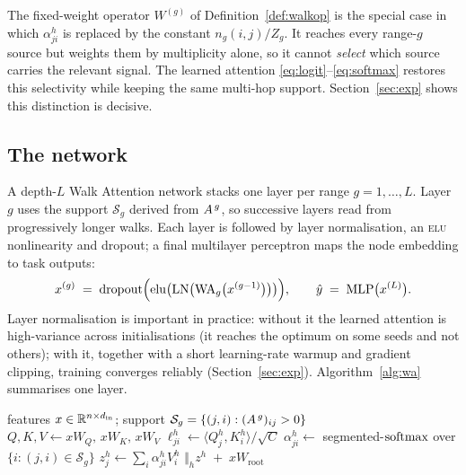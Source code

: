 \begin{remark}
The fixed-weight operator $W^{(g)}$ of Definition~\ref{def:walkop} is the special
case in which $\alpha^h_{ji}$ is replaced by the constant $n_g(i,j)/Z_g$.
It reaches every range-$g$ source but weights them by multiplicity alone, so it
cannot \emph{select} which source carries the relevant signal. The learned
attention \eqref{eq:logit}--\eqref{eq:softmax} restores this selectivity while
keeping the same multi-hop support. Section~\ref{sec:exp} shows this distinction
is decisive.
\end{remark}

\subsection{The network}

A depth-$L$ Walk Attention network stacks one layer per range
$g=1,\dots,L$. Layer $g$ uses the support $\mathcal{S}_g$ derived from
$A^{\,g}$, so successive layers read from progressively longer walks. Each
layer is followed by layer normalisation, an \textsc{elu} nonlinearity and
dropout; a final multilayer perceptron maps the node embedding to task outputs:
\[
  x^{(g)} \;=\; \mathrm{dropout}\Bigl(\mathrm{elu}\bigl(\mathrm{LN}\bigl(
  \mathrm{WA}_g\bigl(x^{(g-1)}\bigr)\bigr)\bigr)\Bigr),\qquad
  \hat y \;=\; \mathrm{MLP}\bigl(x^{(L)}\bigr).
\]
Layer normalisation is important in practice: without it the learned attention is
high-variance across initialisations (it reaches the optimum on some seeds and
not others); with it, together with a short learning-rate warmup and gradient
clipping, training converges reliably (Section~\ref{sec:exp}).
Algorithm~\ref{alg:wa} summarises one layer.

\begin{algorithm}[t]
\caption{Walk Attention layer at range $g$ (sparse).}\label{alg:wa}
\begin{algorithmic}[1]
\Require features $x\in\mathbb{R}^{n\times d_{\text{in}}}$; support
  $\mathcal{S}_g=\{(j,i):(A^{\,g})_{ij}>0\}$
\State $Q,K,V \gets xW_Q,\,xW_K,\,xW_V$ 
  \State $\ell^h_{ji}\gets \langle Q^h_j,K^h_i\rangle/\sqrt{C}$
\EndFor
\State $\alpha^h_{ji}\gets$ segmented-$\operatorname{softmax}$ over $\{i:(j,i)\in\mathcal{S}_g\}$
\State $z^h_j\gets \sum_i \alpha^h_{ji}V^h_i$
\State \Return $\bigl\Vert_h z^h \;+\; xW_{\!\text{root}}$
\end{algorithmic}
\end{algorithm}

